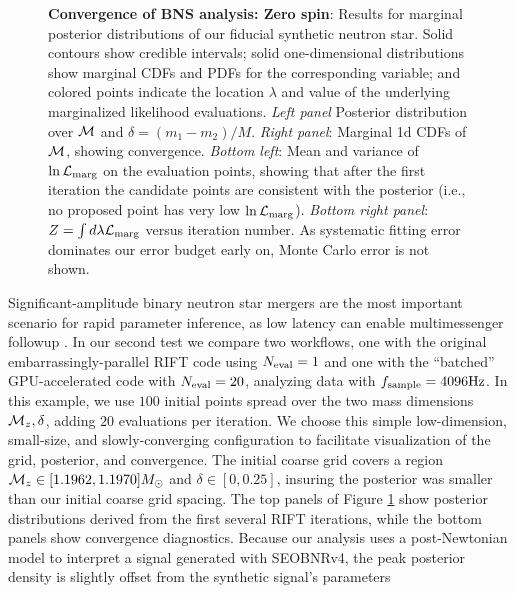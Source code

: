 \documentclass[twocolumn,prd,nofootinbib]{revtex4}
\newcommand\unit[1]{{\rm #1}}
\newcommand\editremark[1]{{\color{red} #1}}
\newcommand{\mc}{{\cal M}}
\begin{document}
\begin{figure}
\caption{\label{fig:BNS:MultiIterate}\textbf{Convergence of BNS analysis: Zero spin}: Results for marginal posterior distributions
  of our fiducial synthetic neutron star.  Solid contours show credible intervals; solid one-dimensional distributions
  show marginal CDFs and PDFs for the corresponding variable; and colored points indicate the location $\lambda$ and
  value of the underlying marginalized likelihood evaluations.  
\emph{Left panel } Posterior distribution
  over  $\mc$ and
  $\delta=(m_1-m_2)/M$.    \emph{Right panel}: Marginal 1d CDFs of $\mc$, showing convergence.
\emph{Bottom left}: Mean and variance of  $\ln{\cal L}_{\rm marg}$ on the evaluation points,  showing that after the
first iteration the
candidate points are consistent with the posterior (i.e., no proposed point has very low $\ln {\cal L}_{\rm marg}$).
\emph{Bottom right panel}: $Z = \int d\lambda {\cal L}_{\rm marg}$ versus iteration number.  As systematic fitting error dominates our
error budget early on, Monte Carlo error is not shown.
}
\end{figure}



Significant-amplitude  binary neutron star mergers are the most important scenario for rapid parameter inference, as low
latency can enable multimessenger followup  \cite{LIGO-O2-Catalog}.    
% 
In our second test we compare two workflows, one with the original embarrassingly-parallel RIFT code using $N_{\rm
  eval}=1$ and one with the
``batched'' GPU-accelerated code with $N_{\rm eval}=20$, analyzing data with $f_{\rm sample}=4096\unit{Hz}$.    
In this example, we use $100$ initial points spread over the two mass dimensions $\mc_z,\delta$, adding $20$ evaluations per
iteration.   We
choose this simple low-dimension, small-size, and slowly-converging configuration to facilitate visualization of the grid, posterior, and convergence.     The initial coarse grid covers a region $\mc_z\in[1.1962,1.1970] M_\odot$ and $\delta \in [0,0.25]$,  insuring the posterior was smaller than our initial
coarse grid spacing.     The top  panels of Figure  \ref{fig:BNS:MultiIterate} show posterior distributions derived
from the first several RIFT iterations, while the bottom panels show convergence diagnostics.
Because our analysis uses a post-Newtonian model to interpret a signal generated with SEOBNRv4, the peak posterior
density is slightly  offset
 from the synthetic signal's parameters
\end{document}
